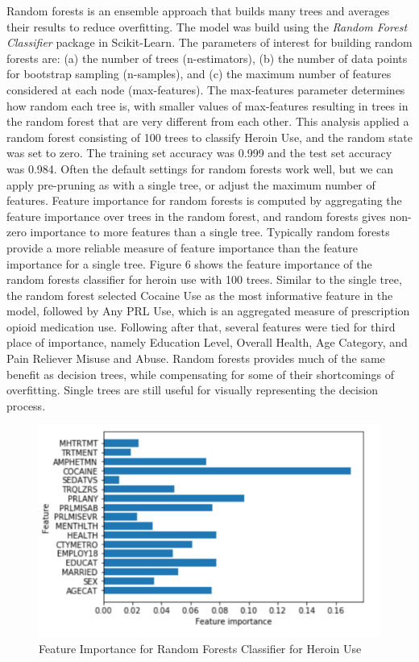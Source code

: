 \documentclass[sigconf]{acmart}
\begin{document}
Random forests is an ensemble approach that builds many trees and averages 
their results to reduce overfitting. The model was build using the 
\emph{Random Forest Classifier} package in Scikit-Learn. The parameters of 
interest for building random forests are: (a) the number of trees 
(n-estimators), (b) the number of data points for bootstrap sampling 
(n-samples), and (c) the maximum number of features considered at each node 
(max-features). The max-features parameter determines how random each tree is, 
with smaller values of max-features resulting in trees in the random forest 
that are very different from each other. This analysis applied a random forest 
consisting of 100 trees to classify Heroin Use, and the random state was set to 
zero. The training set accuracy was 0.999 and the test set accuracy was 0.984. 
Often the default settings for random forests work well, but we can apply
pre-pruning as with a single tree, or adjust the maximum number of features. 
Feature importance for random forests is computed by aggregating the feature 
importance over trees in the random forest, and random forests gives
non-zero importance to more features than a single tree. Typically random
forests provide a more reliable measure of feature importance than the
feature importance for a single tree. Figure 6 shows the feature importance 
of the random forests classifier for heroin use with 100 trees. Similar to
the single tree, the random forest selected Cocaine Use as the most
informative feature in the model, followed by Any PRL Use, which is an 
aggregated measure of prescription opioid medication use. Following after 
that, several features were tied for third place of importance, namely 
Education Level, Overall Health, Age Category, and Pain Reliever Misuse 
and Abuse. Random forests provides much of the same benefit as decision
trees, while compensating for some of their shortcomings of overfitting.
Single trees are still useful for visually representing the decision process.

\begin{figure}[!ht]
  \centering\includegraphics[width=\columnwidth]{images/Figure6.pdf}
  \caption{Feature Importance for Random Forests Classifier for Heroin Use}
  \label{f:Figure6}
\end{figure}
\end{document}
